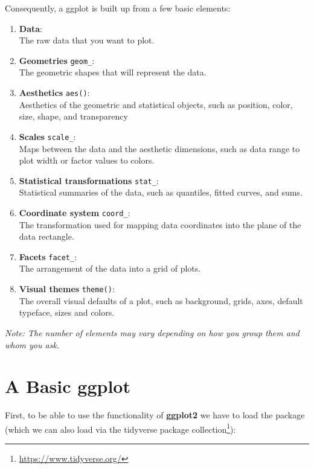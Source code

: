 \documentclass[
]{krantz}
\providecommand{\tightlist}{%
  \setlength{\itemsep}{0pt}\setlength{\parskip}{0pt}}
\renewcommand{\href}[2]{#2\footnote{\url{#1}}}
\begin{document}
Consequently, a ggplot is built up from a few basic elements:

\begin{enumerate}
\def\labelenumi{\arabic{enumi}.}
\tightlist
\item
  \textbf{Data}:\\
  The raw data that you want to plot.
\item
  \textbf{Geometries} \texttt{geom\_}:\\
  The geometric shapes that will represent the data.
\item
  \textbf{Aesthetics} \texttt{aes()}:\\
  Aesthetics of the geometric and statistical objects, such as position, color, size, shape, and transparency
\item
  \textbf{Scales} \texttt{scale\_}:\\
  Maps between the data and the aesthetic dimensions, such as data range to plot width or factor values to colors.
\item
  \textbf{Statistical transformations} \texttt{stat\_}:\\
  Statistical summaries of the data, such as quantiles, fitted curves, and sums.
\item
  \textbf{Coordinate system} \texttt{coord\_}:\\
  The transformation used for mapping data coordinates into the plane of the data rectangle.
\item
  \textbf{Facets} \texttt{facet\_}:\\
  The arrangement of the data into a grid of plots.
\item
  \textbf{Visual themes} \texttt{theme()}:\\
  The overall visual defaults of a plot, such as background, grids, axes, default typeface, sizes and colors.
\end{enumerate}

\emph{Note: The number of elements may vary depending on how you group them and whom you ask.}

\hypertarget{default}{%
\section{A Basic ggplot}\label{default}}

First, to be able to use the functionality of \textbf{ggplot2} we have to load the package (which we can also load via the \href{https://www.tidyverse.org/}{tidyverse package collection}):
\end{document}
